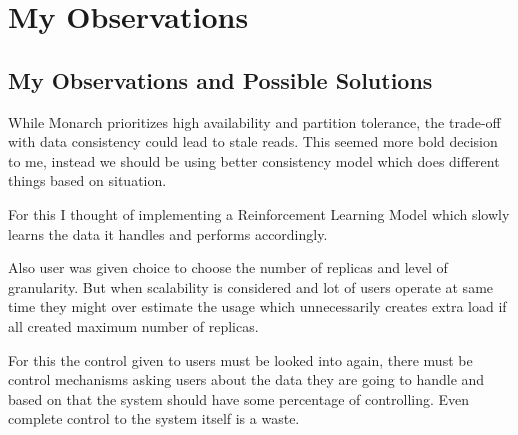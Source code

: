 \chapter{My Observations}

\label{Chapter7} %


\section{My Observations and Possible Solutions}

While Monarch prioritizes high availability and partition tolerance, the trade-off with data consistency could lead to stale reads. This seemed more bold decision to me, instead we should be using better consistency model which does different things based on situation.

For this I thought of implementing a Reinforcement Learning Model which slowly learns the data it handles and performs accordingly.

Also user was given choice to choose the number of replicas and level of granularity. But when scalability is considered and lot of users operate at same time they might over estimate the usage which unnecessarily creates extra load if all created maximum number of replicas.

For this the control given to users must be looked into again, there must be control mechanisms asking users about the data they are going to handle and based on that the system should have some percentage of controlling. Even complete control to the system itself is a waste.

